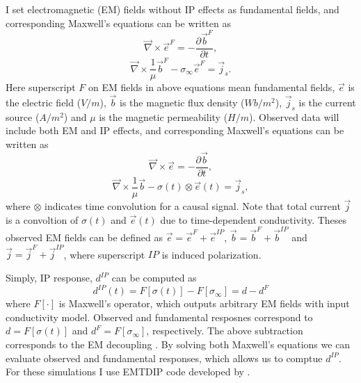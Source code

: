 \documentclass[letterpaper,11pt]{article}
\newcommand{\curl}{{\vec \nabla}\times}
\newcommand{\siginf}{\sigma_\infty}
\renewcommand {\j}  { {\vec j} }
\renewcommand {\b}  { {\vec b} }
\newcommand {\e}  { {\vec e} }
\newcommand{\dip}{d^{IP}}
\begin{document}
I set electromagnetic (EM) fields without IP effects as fundamental fields, and corresponding Maxwell’s equations can be written as 
\begin{equation}
  \curl \e^{F} = -\frac{\partial \b^{F}}{\partial t},
  \label{eq: eq_primary_farad}
\end{equation}
\begin{equation}
  \curl{\frac{1}{\mu}\b^{F}} -\siginf\e^{F} = \j_s.
  \label{eq: eq_primary_coulomb}
\end{equation}
Here superscript $F$ on EM fields in above equations mean fundamental fields, $\e$ is the electric field ($V/m$), $\b$ is the magnetic flux density ($Wb/m^2$), $\j_{s}$ is the current source ($A/m^2$) and $\mu$ is the magnetic permeability ($H/m$).
Observed data will include both EM and IP effects, and corresponding Maxwell’s equations can be written as
\begin{equation}
  \curl{\e} = -\frac{\partial \b}{\partial t},
  \label{eq: total_farad}
\end{equation}
\begin{equation}
  \curl{\frac{1}{\mu}\b} - \sigma(t)\otimes\e(t)= \j_{s},
  \label{eq: total_coulomb}
\end{equation}
where $\otimes$ indicates time convolution for a causal signal. Note that total current $\j$ is a convoltion of $\sigma(t)$ and $\e(t)$ due to time-dependent conductivity. 
Theses observed EM fields can be defined as $\e = \e^{F} + \e^{IP}$, $\b = \b^{F} + \b^{IP}$ and $\j = \j^{F} + \j^{IP}$, where superscript $IP$ is induced polarization. 

Simply, IP response, $\dip$ can be computed as 
\begin{equation}
  \dip(t) = F[\sigma(t)] - F[\siginf] = d-d^F
\end{equation}
where $F[\cdot]$ is Maxwell's operator, which outputs arbitrary EM fields with input conductivity model. Observed and fundamental resposnes correspond to $d=F[\sigma(t)]$ and $d^F=F[\siginf]$, respectively. 
The above subtraction corresponds to the EM decoupling \cite[]{Pelton1978,routh2001}. By solving both Maxwell’s equations we can evaluate observed and fundamental responses, which allows us to comptue $\dip$. For these simulations I use EMTDIP code developed by \cite{Marchant2014}. 
\end{document}
